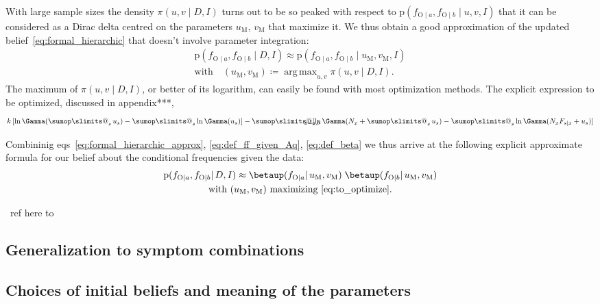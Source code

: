 \documentclass[\ifafour a4paper,12pt,\else a5paper,10pt,\fi%
onecolumn,oneside,article,%
british%
]{memoir}
\makeatletter
\theoremstyle{remark}
\theoremstyle{innote}
\def\sum{\DOTSI\sumop\slimits@}
\newcommand*{\citep}{\parencites}
\newcommand*{\defd}{\coloneqq}
\newcommand*{\pf}{\mathrm{p}}%
\renewcommand*{\|}{\mathpunct{|}}
\newcommand*{\eqns}{eqs}%
\newcommand*{\tsum}{\mathop{\textstyle\sum}\nolimits}
\newcommand*{\puzzle}{\maltese}
\newcommand{\mynote}[1]{ {\color{notecolour}\puzzle\ #1}}
\DeclareMathOperator*{\argmax}{arg\,max}
\newcommand*{\yD}{D}
\newcommand*{\yI}{I}
\newcommand*{\ya}{a}
\newcommand*{\yb}{b}
\newcommand*{\ysA}{\textrm{O}}%
\newcommand*{\dbeta}{\betaup}
\newcommand*{\dA}{\pi}
\newcommand*{\yu}{u}
\newcommand*{\yua}{u}
\newcommand*{\yub}{v}
\newcommand*{\yuam}{\yua_{\text{M}}}
\newcommand*{\yubm}{\yub_{\text{M}}}
\newcommand*{\yna}{k}
\makeatother
\begin{document}
With large sample sizes the density $\dA(\yua,\yub \|\yD, \yI)$ turns out to
be so peaked with respect to
$\pf(f_{\ysA\|\ya}, f_{\ysA\|\yb}\| \yua,\yub,\yI)$ that it can be considered
as a Dirac delta centred on the parameters $\yuam$, $\yubm$ that maximize it.
We thus obtain a good approximation of the updated
belief~\eqref{eq:formal_hierarchic} that doesn't involve parameter integration:
\begin{multline}
  \label{eq:formal_hierarchic_approx}
  \pf(f_{\ysA\|\ya}, f_{\ysA\|\yb} \| \yD, \yI) \approx
  \pf(f_{\ysA\|\ya}, f_{\ysA\|\yb}\| \yuam,\yubm,\yI)\\
  \text{with}\quad
  (\yuam,\yubm) \defd \argmax_{\yua,\yub}\dA(\yua,\yub \|\yD, \yI).
\end{multline}
The maximum of $\dA(\yua,\yub \|\yD, \yI)$, or better of its logarithm, can
easily be found with most optimization methods. The explicit expression to
be optimized, discussed in appendix***,
\begin{equation}
  \label{eq:to_optimize}
  \yna\,[\ln\Gamma(\tsum_s\yu_s) - \tsum_s\ln\Gamma(\yu_s)]
  -\sum_{\mathclap{x=\ya,\yb}}
  [\ln\Gamma(N_x+\tsum_s\yu_s) - \tsum_s\ln\Gamma(N_xF_{s\|x}+\yu_s)]
\end{equation}

Combininig \eqns~\eqref{eq:formal_hierarchic_approx},
\eqref{eq:def_ff_given_Aq}, \eqref{eq:def_beta} we thus arrive at the
following explicit approximate formula for our belief about the conditional
frequencies given the data:
\begin{multline}
  \label{eq:formal_hierarchic_approx_final}
  \pf(f_{\ysA\|\ya}, f_{\ysA\|\yb} \| \yD, \yI) \approx
  \dbeta(f_{\ysA\|\ya} \| \yuam,\yubm)\;
  \dbeta(f_{\ysA\|\yb} \| \yuam,\yubm)\\
  \text{with
    $(\yuam,\yubm)$ maximizing~\eqref{eq:to_optimize}}.
\end{multline}




 \mynote{ref here to \citep{mackay1996}}
\subsection{Generalization to symptom combinations}
\label{sec:generalization_symptom_combinations}




\subsection{Choices of initial beliefs and meaning of the parameters}
\label{sec:choices_prior_info}
\end{document}

